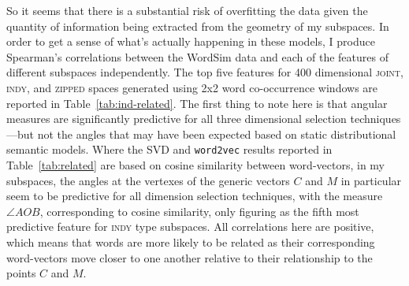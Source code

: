 So it seems that there is a substantial risk of overfitting the data given the quantity of information being extracted from the geometry of my subspaces.  In order to get a sense of what's actually happening in these models, I produce Spearman's correlations between the WordSim data and each of the features of different subspaces independently.  The top five features for 400 dimensional \textsc{joint}, \textsc{indy}, and \textsc{zipped} spaces generated using 2x2 word co-occurrence windows are reported in Table~\ref{tab:ind-related}.  The first thing to note here is that angular measures are significantly predictive for all three dimensional selection techniques---but not the angles that may have been expected based on static distributional semantic models.  Where the SVD and \texttt{word2vec} results reported in Table~\ref{tab:related} are based on cosine similarity between word-vectors, in my subspaces, the angles at the vertexes of the generic vectors $C$ and $M$ in particular seem to be predictive for all dimension selection techniques, with the measure $\angle AOB$, corresponding to cosine similarity, only figuring as the fifth most predictive feature for \textsc{indy} type subspaces.  All correlations here are positive, which means that words are more likely to be related as their corresponding word-vectors move closer to one another relative to their relationship to the points $C$ and $M$.


